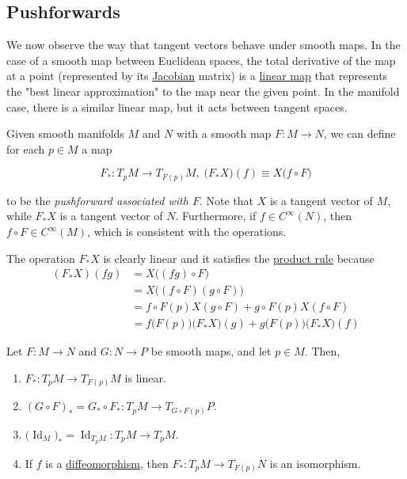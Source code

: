 \documentclass{article}
\DeclareMathOperator{\Id}{Id}
\newcounter{definition}[section]
\begin{document}
  \subsection{Pushforwards}

    We now observe the way that tangent vectors behave under smooth maps. In the case of a smooth map between Euclidean spaces, the total derivative of the map at a point (represented by its \hyperref[mv-def:jacobian]{Jacobian} matrix) is a \hyperref[lin-def:linear_map]{linear map} that represents the "best linear approximation" to the map near the given point. In the manifold case, there is a similar linear map, but it acts between tangent spaces. 

    \begin{definition}
      \label{def:pushforward-of-a-smooth-map}
      Given smooth manifolds $M$ and $N$ with a smooth map $F: M \to N$, we can define for each $p \in M$ a map

        \begin{equation}
          F_*: T_p M \to T_{F(p)} M, \; \big(F_* X \big) (f) \equiv X \big( f \circ F \big)
        \end{equation}

      to be the \textit{pushforward associated with $F$}. Note that $X$ is a tangent vector of $M$, while $F_* X$ is a tangent vector of $N$. Furthermore, if $f \in C^\infty(N)$, then $f \circ F \in C^\infty (M)$, which is consistent with the operations. 

      The operation $F_* X$ is clearly linear and it satisfies the \hyperref[mv-thm:product-rule-2]{product rule} because
      \begin{align*}
        (F_* X) (f g) & = X \big((fg) \circ F \big) \\
        & = X \big( (f \circ F) (g \circ F) \big) \\
        & = f \circ F(p) X(g \circ F) + g \circ F(p) X (f \circ F) \\
        & = f\big(F(p)\big) \big( F_* X \big) (g) + g \big( F(p)\big) \big( F_* X\big) (f)
      \end{align*}
    \end{definition}


    \begin{lemma}
      \label{thm:properties-of-pushforwards}
      Let $F: M \to N$ and $G: N \to P$ be smooth maps, and let $p \in M$. Then, 
      \begin{enumerate}
        \item $F_*: T_p M \to T_{F(p)} M$ is linear. 
        \item $(G \circ F)_* = G_* \circ F_* : T_p M \to T_{G \circ F (p)} P$. 
        \item $\big( \Id_M \big)_* = \Id_{T_p M} : T_p M \to T_p M$. 
        \item If $f$ is a \hyperref[def:diffeomorphism-2]{diffeomorphism}, then $F_*: T_p M \to T_{F(p)} N$ is an isomorphism. 
      \end{enumerate}
    \end{lemma}
\end{document}
